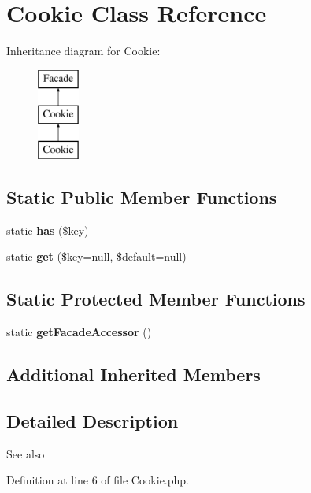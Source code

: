 \section{Cookie Class Reference}
\label{class_illuminate_1_1_support_1_1_facades_1_1_cookie}
Inheritance diagram for Cookie\+:\begin{figure}[H]
\begin{center}
\leavevmode
\includegraphics[height=3.000000cm]{class_illuminate_1_1_support_1_1_facades_1_1_cookie}
\end{center}
\end{figure}
\subsection*{Static Public Member Functions}
\begin{DoxyCompactItemize}
\item 
static {\bf has} (\$key)
\item 
static {\bf get} (\$key=null, \$default=null)
\end{DoxyCompactItemize}
\subsection*{Static Protected Member Functions}
\begin{DoxyCompactItemize}
\item 
static {\bf get\+Facade\+Accessor} ()
\end{DoxyCompactItemize}
\subsection*{Additional Inherited Members}


\subsection{Detailed Description}
\begin{DoxySeeAlso}{See also}

\end{DoxySeeAlso}


Definition at line 6 of file Cookie.\+php.



